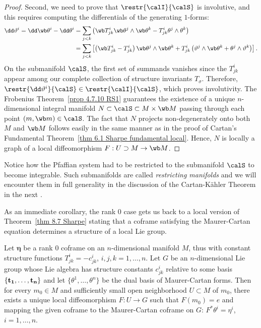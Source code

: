 \begin{proof}
    Second, we need to prove that $\restr{\calI}{\calS}$ is involutive, and this requires computing the differentials of the generating $1$-forms:
    \begin{align}
        \dd\vartheta^i=\dd \wb\theta^i-\dd \theta^i&=\sum_{j<k}\left(\wb T^i_{jk}\wb\theta^j\wedge\wb\theta^k-T^i_{jk}\theta^j\wedge\theta^k\right)\notag\\
        & = \sum_{j<k}\left[\left(\wb T^i_{jk}-T^i_{jk}\right)\wb\theta^j\wedge\wb\theta^k+T^i_{jk}\left(\vartheta^j\wedge\wb\theta^k+\theta^j\wedge\vartheta^k\right)\right].
    \end{align}
    On the submanifold $\calS$, the first set of summands vanishes since the $T^i_{jk}$ appear among our complete collection of structure invariants $T_\sigma$. Therefore, $\restr{\dd\vartheta^i}{\calS}\in \restr{\calI}{\calS}$, which proves involutivity. The Frobenius Theorem~\ref{prop 4.7.10 RS1} guarantees the existence of a unique $n$-dimensional integral manifold $N\subset\calS\subset M\times\wb M$ passing through each point $(m,\wb m)\in \calS$. The fact that $N$ projects non-degenerately onto both $M$ and $\wb M$ follows easily in the same manner as in the proof of Cartan's Fundamental Theorem~\ref{thm 6.1 Sharpe fundamental local}. Hence, $N$ is locally a graph of a local diffeomorphism $F:U\supset M\to \wb M$.
\end{proof}

\begin{rem}
    Notice how the Pfaffian system had to be restricted to the submanifold $\calS$ to become integrable. Such submanifolds are called \emph{restricting manifolds} and we will encounter them in full generality in the discussion of the Cartan-K\"ahler Theorem in the next \chap.
\end{rem}

As an immediate corollary, the rank $0$ case gets us back to a local version of Theorem~\ref{thm 8.7 Sharpe} stating that a coframe satisfying the Maurer-Cartan equation determines a structure of a local Lie group.

\begin{cor}\label{thm 14.18 Olver93}
    Let $\bm\eta$ be a rank $0$ coframe on an $n$-dimensional manifold $M$, thus with constant structure functions $T^i_{jk}=-c^i_{jk}$, $i,j,k=1,\ldots,n$. Let $G$ be an $n$-dimensional Lie group whose Lie algebra has structure constants $c^i_{jk}$ relative to some basis $\{\bf{t}_1,\ldots,\bf{t}_n\}$ and let $\{\theta^1,\ldots,\theta^n\}$ be the dual basis of Maurer-Cartan forms. Then for every $m_0\in M$ and sufficiently small open neighborhood $U\subset M$ of $m_0$, there exists a unique local diffeomorphism $F:U\to G$ such that $F(m_0)=e$ and mapping the given coframe to the Maurer-Cartan coframe on $G$: $F^\ast\theta^i=\eta^i$, $i=1,\ldots,n$.
\end{cor}


